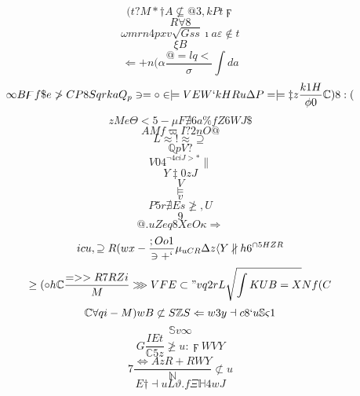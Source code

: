 \documentclass[12pt]{article}
\begin{document}
        \begin{minipage}[t][0pt]{\linewidth}

        \[(t?M*\dagger A\nsubseteq @ 3 , k P t\digamma\]
\[R\forall 8\]
\[\omega m r n 4 p x v\sqrt{Gss}\imath a\varepsilon {\notin t}\]
\[\xi B\]
\[\Longleftarrow + n (\alpha\frac{@=lq<}{\sigma}\int d a\]
\[\infty B\digamma f\$ e\ngtr C P 8 S q r k a Q_{p}\ni =\circ\in\models V E W ` k H {Ru}\Delta P =\models\ddagger z\frac{k1H}{\phi 0}\mathbb{C} ) 8 : (\]
\[zMe\Theta < 5 -\mu F\nexists 6 a\% f Z 6 W J\$\]
\[AMf\varpi I ? 2 n O @\]
\[L\approx !\approx\supseteq\]
\[\mathbb{Q} p V ?\]
\[V04^{\neg 4 c i J > *}\parallel\]
\[Y\ddagger 0 z J\]
\[V\]
\[\models\]
\[v\]
\[P5r\nexists E s\ngeq , U\]
\[9\]
\[@.uZeq8XeO\kappa\Longrightarrow\]
\[icu,\supseteq R ( w x -\frac{;Oo1}{\ni + `}\mu_{uCR}\Delta z\langle Y\nparallel h 6^{\cap 5 H Z R}\]
\[\geq (\circ h\mathbb{C}\frac{=>>R7RZi}{M}\ggg V F E\subset " v q 2 r L\sqrt{\int K U B = X} N f ( C\]
\[\mathbb{C}\forall q i - M ) w B\not\subset S\mathbb{Z} S\Leftarrow w 3 y\dashv c 8 ` u\mathbb{S}\varsigma 1\]
\[\mathbb{S} v\infty\]
\[G\frac{IEt}{\mathbb{C} 5 z}\ngeq u {:}\digamma W V Y\]
\[7\frac{\iff A z R + R W Y}{\mathbb{N}}\not\subset u\]
\[E\dagger\dashv u L\vartheta . f\Xi\mathbb{H} 4 w J
        \]
\end{minipage}
\end{document}
